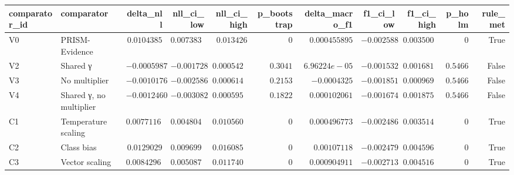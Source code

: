 \begin{tabular}{llrrrrrrrrr}
\toprule
comparator\_id & comparator & delta\_nll & nll\_ci\_low & nll\_ci\_high & p\_bootstrap & delta\_macro\_f1 & f1\_ci\_low & f1\_ci\_high & p\_holm & rule\_met \\
\midrule
V0 & PRISM-Evidence & $0.0104385$ & $0.00738354$ & $0.013426$ & $0$ & $0.000455895$ & $-0.0025882$ & $0.0035006$ & $0$ & True \\
V2 & Shared γ & $-0.000598712$ & $-0.00172801$ & $0.000542543$ & $0.3041$ & $6.96224e-05$ & $-0.00153206$ & $0.00168195$ & $0.5466$ & False \\
V3 & No multiplier & $-0.00101766$ & $-0.00258654$ & $0.000614468$ & $0.2153$ & $-0.0004325$ & $-0.00185195$ & $0.000969674$ & $0.5466$ & False \\
V4 & Shared γ, no multiplier & $-0.00124608$ & $-0.00308285$ & $0.000595546$ & $0.1822$ & $0.000102061$ & $-0.00167454$ & $0.00187507$ & $0.5466$ & False \\
C1 & Temperature scaling & $0.00771162$ & $0.00480412$ & $0.0105602$ & $0$ & $0.000496773$ & $-0.00248637$ & $0.00351446$ & $0$ & True \\
C2 & Class bias & $0.0129029$ & $0.00969982$ & $0.0160853$ & $0$ & $0.00107118$ & $-0.00247966$ & $0.00459601$ & $0$ & True \\
C3 & Vector scaling & $0.00842967$ & $0.00508711$ & $0.0117405$ & $0$ & $0.000904911$ & $-0.00271349$ & $0.00451644$ & $0$ & True \\
\bottomrule
\end{tabular}
